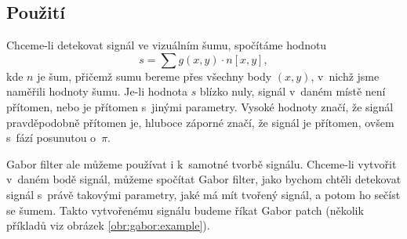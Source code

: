 \subsection{Použití}

Chceme-li detekovat signál ve vizuálním šumu, spočítáme hodnotu $$s=\sum
g(x,y)\cdot n[x,y],$$ kde $n$ je šum, přičemž sumu bereme přes všechny body $(x,y)$,
v~nichž jsme naměřili hodnoty šumu. Je-li hodnota $s$  blízko nuly, signál
v~daném místě není přítomen, nebo je přítomen s~jinými parametry. Vysoké hodnoty
značí, že
signál pravděpodobně přítomen je, hluboce záporné značí, že signál je přítomen,
ovšem s~fází posunutou o~$\pi$.

Gabor filter ale můžeme používat i k~samotné tvorbě signálu. Chceme-li vytvořit
v~daném bodě signál, můžeme spočítat Gabor filter, jako bychom chtěli
detekovat signál s~právě takovými parametry, jaké má mít tvořený signál, a
potom ho sečíst se šumem. Takto vytvořenému signálu budeme říkat Gabor patch (několik příkladů viz obrázek \ref{obr:gabor:example}).

